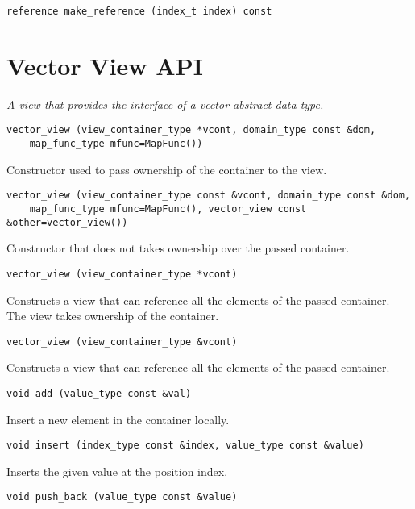 \begin{verbatim}
reference make_reference (index_t index) const
\end{verbatim}

\section{Vector View API  } \label{sec-vec-vw}

\emph{A view that provides the interface of a vector abstract data type. }

\begin{verbatim}
vector_view (view_container_type *vcont, domain_type const &dom,
    map_func_type mfunc=MapFunc())
\end{verbatim}

Constructor used to pass ownership of the container to the view.

\begin{verbatim}
vector_view (view_container_type const &vcont, domain_type const &dom,
    map_func_type mfunc=MapFunc(), vector_view const &other=vector_view())
\end{verbatim}

Constructor that does not takes ownership over the passed container.

\begin{verbatim}
vector_view (view_container_type *vcont)
\end{verbatim}

Constructs a view that can reference all the elements of the passed container. The view takes ownership of the container.

\begin{verbatim}
vector_view (view_container_type &vcont)
\end{verbatim}

Constructs a view that can reference all the elements of the passed container.

\begin{verbatim}
void add (value_type const &val)
\end{verbatim}

Insert a new element in the container locally.

\begin{verbatim}
void insert (index_type const &index, value_type const &value)
\end{verbatim}

Inserts the given value at the position index.

\begin{verbatim}
void push_back (value_type const &value)
\end{verbatim}

